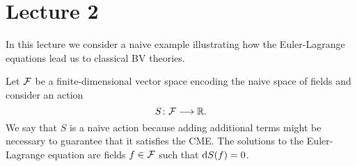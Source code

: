 \chapter{Lecture 2}

In this lecture we consider a naive example illustrating how the Euler-Lagrange equations lead us to classical BV theories.

\begin{example}
  Let $\mathcal{F}$ be a finite-dimensional vector space encoding the naive space of fields and consider an action
  \begin{equation*}
    S \colon \mathcal{F} \longrightarrow \mathbb{R}.
  \end{equation*}
  We say that $S$ is a naive action because adding additional terms might be necessary to guarantee that it satisfies the CME.
  The solutions to the Euler-Lagrange equation are fields $f \in \mathcal{F}$ such that ${\mathrm{d} S} (f) = 0$.


\end{example}
